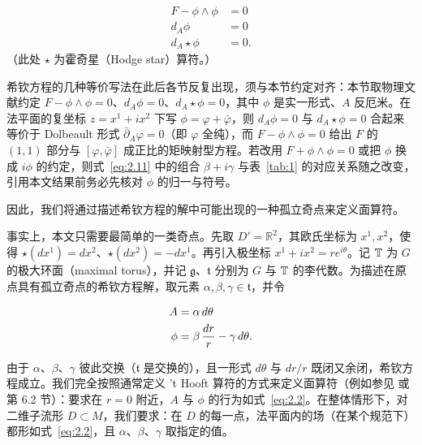 \setcounter{equation}{0}
\begin{equation}\label{eq:2.1}
  \begin{aligned}F-\phi\wedge \phi& = 0 \\
                     d_A\phi & = 0 \\
                     d_A\star \phi & = 0.\end{aligned}
\end{equation}
 （此处 $\star$ 为霍奇星（Hodge star）算符。）
\begin{yizhu}[易错点]
希钦方程的几种等价写法在此后各节反复出现，须与本节约定对齐：本节取物理文献约定 $F-\phi\wedge\phi=0$、$d_A\phi=0$、$d_A\star\phi=0$，其中 $\phi$ 是实一形式、$A$ 反厄米。在法平面的复坐标 $z=x^1+ix^2$ 下写 $\phi=\varphi+\bar\varphi$，则 $d_A\phi=0$ 与 $d_A\star\phi=0$ 合起来等价于 Dolbeault 形式 $\bar\partial_A\varphi=0$（即 $\varphi$ 全纯），而 $F-\phi\wedge\phi=0$ 给出 $F$ 的 $(1,1)$ 部分与 $[\varphi,\bar\varphi]$ 成正比的矩映射型方程。若改用 $F+\phi\wedge\phi=0$ 或把 $\phi$ 换成 $i\phi$ 的约定，则式~\eqref{eq:2.11} 中的组合 $\beta+i\gamma$ 与表~\ref{tab:1} 的对应关系随之改变，引用本文结果前务必先核对 $\phi$ 的归一与符号。
\end{yizhu}

因此，我们将通过描述希钦方程的解中可能出现的一种孤立奇点来定义面算符。

事实上，本文只需要最简单的一类奇点。先取 $D'=\mathbb{R}^2$，其欧氏坐标为 $x^1,x^2$，使得 $\star (dx^1)=dx^2$、$\star(dx^2)=-dx^1$。再引入极坐标 $x^1+ix^2=re^{i\theta}$。记 ${\mathbb{T}}$ 为 $G$ 的极大环面（maximal torus），并记 $\mathfrak g$、$\mathfrak t$ 分别为 $G$ 与 ${\mathbb{T}}$ 的李代数。为描述在原点具有孤立奇点的希钦方程解，取元素 $\alpha,\beta,\gamma\in \mathfrak t$，并令

\setcounter{equation}{1}
\begin{equation}\label{eq:2.2}
  \begin{aligned}A &
= \alpha \,d\theta \\
           \phi & = \beta\,{dr\over r}-\gamma\,d\theta.\end{aligned}
\end{equation}

由于 $\alpha$、$\beta$、$\gamma$ 彼此交换（$\mathfrak t$ 是交换的），且一形式 $d\theta$ 与 $dr/r$ 既闭又余闭，希钦方程成立。我们完全按照通常定义 't Hooft 算符的方式来定义面算符（例如参见 \cite{ref38} 或 \cite{ref8} 第 6.2 节）：要求在 $r=0$ 附近，$A$ 与 $\phi$ 的行为如式~\eqref{eq:2.2}。在整体情形下，对二维子流形 $D\subset M$，我们要求：在 $D$ 的每一点，法平面内的场（在某个规范下）都形如式~\eqref{eq:2.2}，且 $\alpha$、$\beta$、$\gamma$ 取指定的值。

